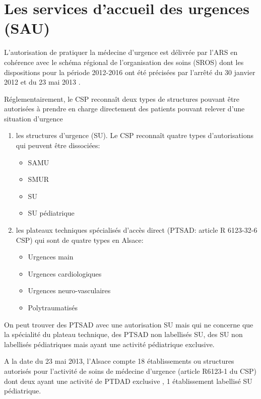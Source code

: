 \documentclass[12pt,english,french,twoside]{book}\usepackage[]{graphicx}\usepackage[]{color}
\begin{document}
\section{Les services d'accueil des urgences (SAU)}

L'autorisation de pratiquer la médecine d'urgence est délivrée par l'ARS en cohérence avec le schéma régional de l'organisation des soins (SROS) dont les dispositions pour la période 2012-2016 ont été précisées par l'arrêté du 30 janvier 2012 \cite{14} et du 23 mai 2013 \cite{15}.

Réglementairement, le CSP reconnaît deux types de structures pouvant être autorisées à prendre en charge directement des patients pouvant relever d'une situation d'urgence
\begin{enumerate}
  \item les structures d'urgence (SU). Le CSP reconnaît quatre types d'autorisations qui peuvent être dissociées:
    \begin{itemize}
      \item SAMU
      \item SMUR
      \item SU
      \item SU pédiatrique
    \end{itemize}

  \item les plateaux techniques spécialisés d'accès direct (PTSAD: article R 6123-32-6 CSP) qui sont de quatre types en Alsace:
    \begin{itemize}
      \item Urgences main
      \item Urgences cardiologiques
      \item Urgences neuro-vasculaires
      \item Polytraumatisés
    \end{itemize}
\end{enumerate}

On peut trouver des PTSAD avec une autorisation SU mais qui ne concerne que la spécialité du plateau technique, des PTSAD non labellisés SU, des SU non labellisés pédiatriques mais ayant une activité pédiatrique exclusive.

A la date du 23 mai 2013, l'Alsace compte 18 établissements ou structures autorisés pour l'activité de soins de médecine d'urgence (article R6123-1 du CSP) dont deux ayant une activité de PTDAD exclusive \cite{15}, 1 établissement labellisé SU pédiatrique.
\end{document}
